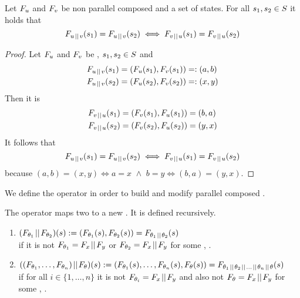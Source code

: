 \documentclass[preview]{standalone}
\begin{document}
\begin{proposition}
	Let $\grpfct[u]$ and $\grpfct[v]$ be non parallel composed \grpfctsN and \states a set of states. For all $\state_1, \state_2 \in \states$ it holds that
	\[
	\grpfct[u \pll v](\state_1) = \grpfct[u \pll v](\state_2) \iff \grpfct[v \pll u](\state_1) = \grpfct[v \pll u](\state_2)
	\]
\end{proposition}

\begin{proof}
	Let $\grpfct[u]$ and $\grpfct[v]$ be \grpfctsN, $\state_1, \state_2 \in \states$ and
	\begin{align*}
		\grpfct[u \pll v](\state_1) &= (\grpfct[u](\state_1), \grpfct[v](\state_1)) =: (a, b) \\
		\grpfct[u \pll v](\state_2) &= (\grpfct[u](\state_2), \grpfct[v](\state_2)) =: (x, y)			
	\end{align*}
	Then it is
	\begin{align*}
		\grpfct[v \pll u](\state_1) &= (\grpfct[v](\state_1), \grpfct[u](\state_1)) = (b, a) \\
		\grpfct[v \pll u](\state_2) &= (\grpfct[v](\state_2), \grpfct[u](\state_2)) = (y, x)
	\end{align*}
	It follows that
	\[
	\grpfct[u \pll v](\state_1) = \grpfct[u \pll v](\state_2) \iff \grpfct[v \pll u](\state_1) = \grpfct[v \pll u](\state_2)
	\]
	because $(a, b) = (x, y) \iff a = x \,\, \land \,\, b = y \iff (b, a) = (y, x)$.
\end{proof}

We define the operator \pll in order to build and modify parallel composed \viewsN. 

\begin{definition}
	The operator \pll maps two \grpfctsN to a new \grpfctN. It is defined recursively.
	\begin{enumerate}
		\item $(\grpfct[\viewppty_1] \pll \grpfct[\viewppty_2])(\state) := (\grpfct[\viewppty_1](\state),\grpfct[\viewppty_2](\state)) = \grpfct[\viewppty_1 \pll \viewppty_2](\state)$ \\
		if it is not $\grpfct[\viewppty_1] = \grpfct[x] \pll \grpfct[y]$ or $\grpfct[\viewppty_2] = \grpfct[x] \pll \grpfct[y]$ for some \grpfctsN \grpfct[x], \grpfct[y].
		\item $((\grpfct[\viewppty_1], \dots, \grpfct[\viewppty_n]) \pll \grpfct[\viewppty])(\state) := (\grpfct[\viewppty_1](\state), \dots, \grpfct[\viewppty_n](\state), \grpfct[\viewppty](\state)) = \grpfct[{\viewppty_1 \pll \viewppty_2 \pll \dots \pll \viewppty_n \pll \viewppty}](\state)$ 
		\\ if for all $i \in \{1, \dots, n\}$ it is not $\grpfct[\viewppty_i] = \grpfct[x] \pll \grpfct[y]$ and also not $\grpfct = \grpfct[x] \pll \grpfct[y]$ for some \grpfctsN \grpfct[x], \grpfct[y].
	\end{enumerate}
	
\end{definition}
\end{document}

